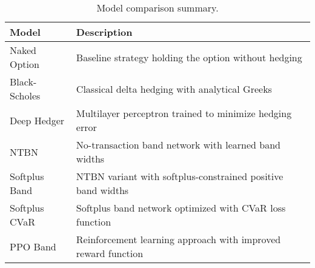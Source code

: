 \begin{table}[h]
  \centering
  \caption{Model comparison summary.}
  \begin{tabularx}{\linewidth}{@{}lX@{}}
    \toprule
    Model & Description \\
    \midrule
    Naked Option & Baseline strategy holding the option without hedging \\
    Black-Scholes & Classical delta hedging with analytical Greeks \\
    Deep Hedger & Multilayer perceptron trained to minimize hedging error \\
    NTBN & No-transaction band network with learned band widths \\
    Softplus Band & NTBN variant with softplus-constrained positive band widths \\
    Softplus CVaR & Softplus band network optimized with CVaR loss function \\
    PPO Band & Reinforcement learning approach with improved reward function \\
    \bottomrule
  \end{tabularx}
\end{table} 